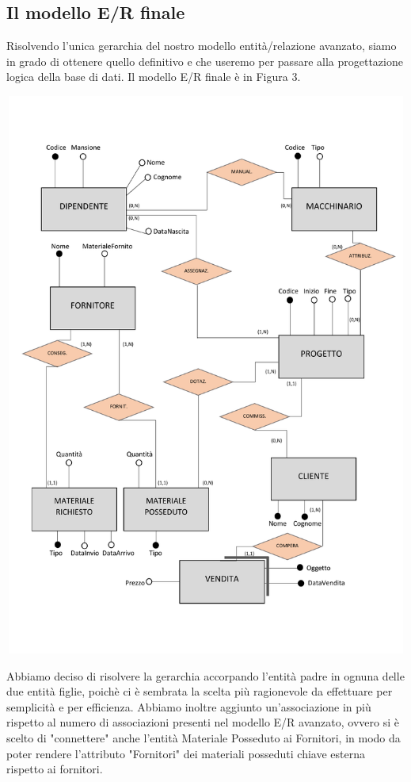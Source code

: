 \documentclass[a4paper,12pt,italian]{article}
\begin{document}
\subsection{Il modello E/R finale}
Risolvendo l'unica gerarchia del nostro modello entità/relazione avanzato, siamo in grado di ottenere quello definitivo e che useremo per passare alla progettazione logica della base di dati.
Il modello E/R finale è in Figura 3.

\begin{center}
\includegraphics[width=15cm, height=18.6cm]{diagrammaerfinale.pdf}
\end{center}
Abbiamo deciso di risolvere la gerarchia accorpando l'entità padre in ognuna delle due entità figlie, poichè ci è sembrata la scelta più ragionevole da effettuare per semplicità e per efficienza.
Abbiamo inoltre aggiunto un'associazione in più rispetto al numero di associazioni presenti nel modello E/R avanzato, ovvero si è scelto di "connettere" anche l'entità Materiale Posseduto ai Fornitori, in modo da poter rendere l'attributo "Fornitori" dei materiali posseduti chiave esterna rispetto ai fornitori. \\ \\
\end{document}
